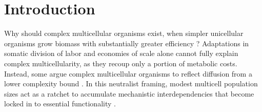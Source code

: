 



\section{Introduction}

Why should complex multicellular organisms exist, when simpler unicellular organisms grow biomass with substantially greater efficiency \citep{lynch2024bioenergetic}?
Adaptations in somatic division of labor and economies of scale \unskip\citep{Saunders1976,corning2015synergistic,niklas2014evolutionary,Bell1997} alone cannot fully explain complex multicellularity, as they recoup only a portion of metabolic costs.
Instead, some argue complex multicellular organisms to reflect diffusion from a lower complexity bound \citep{Gould1988,gould1990wonderful,gould2011full,mcshea2010biology,Lehman2010,Miconi2008}.
In this neutralist framing, modest multicell population sizes act as a ratchet to accumulate mechanistic interdependencies that become locked in to essential functionality \citep{lynch2003origins,Smith1972,stoltzfus1999possibility,muozgmez2021constructive}.

